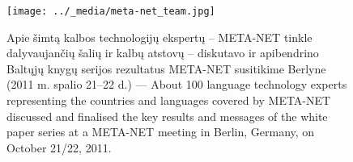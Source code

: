 \begin{figure}[htbp]
  \center
  \texttt{[image: ../\_media/meta-net\_team.jpg]}
  \caption{Apie šimtą kalbos technologijų ekspertų -- META-NET tinkle dalyvaujančių šalių ir kalbų atstovų -- diskutavo ir apibendrino Baltųjų knygų serijos rezultatus META-NET susitikime Berlyne (2011 m. spalio 21–22 d.) --- \textcolor{grey1}{About 100 language technology experts representing the countries and languages covered by META-NET discussed and finalised the key results and messages of the white paper series at a META-NET meeting in Berlin, Germany, on October 21/22, 2011.}}
  \medskip
\end{figure}

\cleardoublepage

{}
\label{whitepaperseries}

